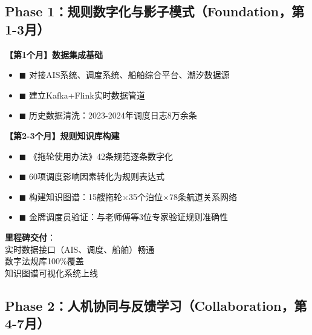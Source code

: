 \documentclass[12pt,a4paper]{article}
\begin{document}
\vspace{0.5cm}

\subsection{Phase 1：规则数字化与影子模式（Foundation，第1-3月）}

\begin{tcolorbox}[colback=cyan!5!white,colframe=cyan!75!black,title=\textbf{阶段目标：完成L1/L2/L3级约束的数字化建模，跑通数据流}]

\textbf{【第1个月】数据集成基础}

\begin{itemize}[label={}, leftmargin=*, itemsep=3pt]
    \item \textcolor{cyan!70!black}{$\blacksquare$} 对接AIS系统、调度系统、船舶综合平台、潮汐数据源
    \item \textcolor{cyan!70!black}{$\blacksquare$} 建立Kafka+Flink实时数据管道
    \item \textcolor{cyan!70!black}{$\blacksquare$} 历史数据清洗：2023-2024年调度日志8万余条
\end{itemize}

\textbf{【第2-3个月】规则知识库构建}

\begin{itemize}[label={}, leftmargin=*, itemsep=3pt]
    \item \textcolor{cyan!70!black}{$\blacksquare$} 《拖轮使用办法》42条规范逐条数字化
    \item \textcolor{cyan!70!black}{$\blacksquare$} 60项调度影响因素转化为规则表达式
    \item \textcolor{cyan!70!black}{$\blacksquare$} 构建知识图谱：15艘拖轮$\times$35个泊位$\times$78条航道关系网络
    \item \textcolor{cyan!70!black}{$\blacksquare$} 金牌调度员验证：与老师傅等3位专家验证规则准确性
\end{itemize}

\vspace{0.3cm}
\colorbox{green!20}{\parbox{0.95\linewidth}{
\textbf{里程碑交付}：\\
\checkmark 实时数据接口（AIS、调度、船舶）畅通\\
\checkmark 数字法规库100\%覆盖\\
\checkmark 知识图谱可视化系统上线
}}
\end{tcolorbox}

\vspace{0.5cm}

\subsection{Phase 2：人机协同与反馈学习（Collaboration，第4-7月）}
\end{document}
